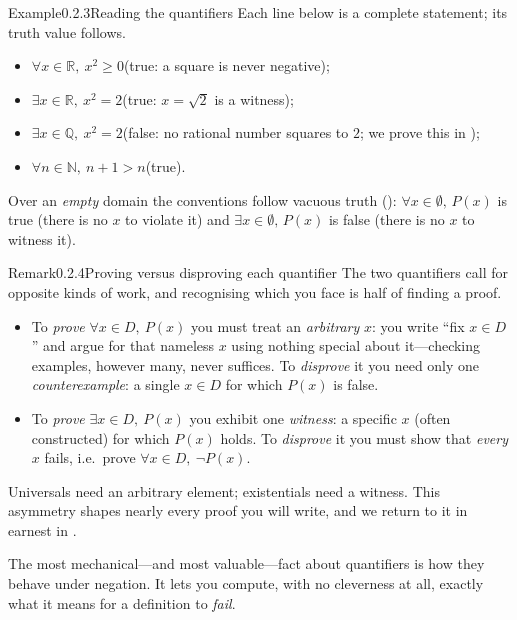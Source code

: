 \documentclass[main.tex]{subfiles}
\begin{document}
\begin{ObjL}{Example}{0.2.3}{Reading the quantifiers}
Each line below is a complete statement; its truth value follows.
\begin{itemize}
  \item $\forall x\in\mathbb R,\ x^2\ge 0$\quad(true: a square is never negative);
  \item $\exists x\in\mathbb R,\ x^2=2$\quad(true: $x=\sqrt2$ is a witness);
  \item $\exists x\in\mathbb Q,\ x^2=2$\quad(false: no rational number squares to $2$; we prove this
        in );
  \item $\forall n\in\mathbb N,\ n+1>n$\quad(true).
\end{itemize}
Over an \emph{empty} domain the conventions follow vacuous truth ():
$\forall x\in\emptyset,\,P(x)$ is true (there is no $x$ to violate it) and
$\exists x\in\emptyset,\,P(x)$ is false (there is no $x$ to witness it).
\end{ObjL}

\begin{ObjL}{Remark}{0.2.4}{Proving versus disproving each quantifier}
The two quantifiers call for opposite kinds of work, and recognising which you face is half of
finding a proof.
\begin{itemize}
  \item To \emph{prove} $\forall x\in D,\ P(x)$ you must treat an \emph{arbitrary} $x$: you write
        ``fix $x\in D$'' and argue for that nameless $x$ using nothing special about it---checking
        examples, however many, never suffices. To \emph{disprove} it you need only one
        \emph{counterexample}: a single $x\in D$ for which $P(x)$ is false.
  \item To \emph{prove} $\exists x\in D,\ P(x)$ you exhibit one \emph{witness}: a specific $x$ (often
        constructed) for which $P(x)$ holds. To \emph{disprove} it you must show that \emph{every}
        $x$ fails, i.e.\ prove $\forall x\in D,\ \neg P(x)$.
\end{itemize}
Universals need an arbitrary element; existentials need a witness. This asymmetry shapes nearly every
proof you will write, and we return to it in earnest in .
\end{ObjL}

\noindent The most mechanical---and most valuable---fact about quantifiers is how they behave under
negation. It lets you compute, with no cleverness at all, exactly what it means for a definition to
\emph{fail}.
\end{document}
